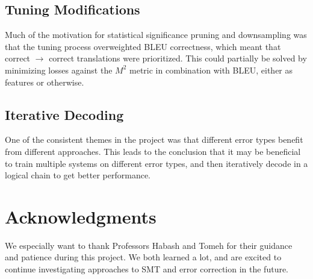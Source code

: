 \documentclass[11pt,letterpaper]{article}
\begin{document}
\subsection{Tuning Modifications}

Much of the motivation for statistical significance pruning and downsampling was that the tuning process overweighted BLEU correctness, which meant that correct $\rightarrow$ correct translations were prioritized. This could partially be solved by minimizing losses against the $M^2$ metric in combination with BLEU, either as features or otherwise.

\subsection{Iterative Decoding}

One of the consistent themes in the project was that different error types benefit from different approaches. This leads to the conclusion that it may be beneficial to train multiple systems on different error types, and then iteratively decode in a logical chain to get better performance.

\section*{Acknowledgments}

We especially want to thank Professors Habash and Tomeh for their guidance and patience during this project. We both learned a lot, and are excited to continue investigating approaches to SMT and error correction in the future.
\end{document}
